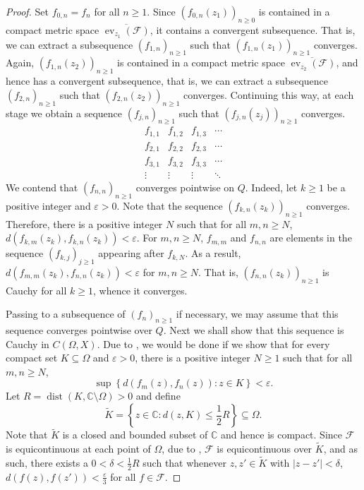 \documentclass[11pt]{article}
\theoremstyle{thmstyle}
\theoremstyle{defstyle}
\newcommand{\bbC}{\mathbb{C}}
\newcommand{\scrF}{\mathscr{F}}
\newcommand{\wt}[1]{\widetilde{#1}}
\newcommand{\ev}{\operatorname{ev}}
\renewcommand{\le}{\leqslant}
\renewcommand{\ge}{\geqslant}
\begin{document}
\begin{proof}
    Set $f_{0, n} = f_n$ for all $n\ge 1$. Since $(f_{0, n}(z_1))_{n\ge 0}$ is contained in a compact metric space $\overline{\ev_{z_1}(\scrF)}$, it contains a convergent subsequence. That is, we can extract a subsequence $(f_{1, n})_{n\ge 1}$ such that $(f_{1, n}(z_1))_{n\ge 1}$ converges. Again, $(f_{1, n}(z_2))_{n\ge 1}$ is contained in a compact metric space $\overline{\ev_{z_2}(\scrF)}$, and hence has a convergent subsequence, that is, we can extract a subsequence $(f_{2, n})_{n\ge 1}$ such that $(f_{2, n}(z_2))_{n\ge 1}$ converges. Continuing this way, at each stage we obtain a sequence $(f_{j, n})_{n\ge 1}$ such that $(f_{j, n}(z_j))_{n\ge 1}$ converges.
    \begin{equation*}
        \begin{array}{cccc}
            f_{1, 1} & f_{1,2} & f_{1,3} & \cdots\\
            f_{2, 1} & f_{2,2} & f_{2,3} & \cdots\\
            f_{3, 1} & f_{3,2} & f_{3,3} & \cdots\\
            \vdots & \vdots & \vdots & \ddots
        \end{array}
    \end{equation*}
    We contend that $(f_{n, n})_{n\ge 1}$ converges pointwise on $Q$. Indeed, let $k\ge 1$ be a positive integer and $\varepsilon > 0$. Note that the sequence $(f_{k, n}(z_k))_{n\ge 1}$ converges. Therefore, there is a positive integer $N$ such that for all $m,n\ge N$, $d(f_{k, m}(z_k), f_{k, n}(z_k)) < \varepsilon$. For $m,n\ge N$, $f_{m,m}$ and $f_{n, n}$ are elements in the sequence $(f_{k, j})_{j\ge 1}$ appearing after $f_{k, N}$. As a result, $d(f_{m, m}(z_k), f_{n, n}(z_k)) < \varepsilon$ for $m,n\ge N$. That is, $(f_{n, n}(z_k))_{n\ge 1}$ is Cauchy for all $k\ge 1$, whence it converges.

    Passing to a subsequence of $(f_n)_{n\ge 1}$ if necessary, we may assume that this sequence converges pointwise over $Q$. Next we shall show that this sequence is Cauchy in $C(\Omega, X)$. Due to , we would be done if we show that for every compact set $K\subseteq\Omega$ and $\varepsilon > 0$, there is a positive integer $N\ge 1$ such that for all $m,n\ge N$, 
    \begin{equation*}
        \sup\left\{d(f_m(z), f_n(z))\colon z\in K\right\} < \varepsilon.
    \end{equation*}
    Let $R = \operatorname{dist}(K, \bbC\setminus\Omega) > 0$ and define 
    \begin{equation*}
        \wt K = \left\{z\in\bbC\colon d(z, K) \le \frac{1}{2}R\right\}\subseteq\Omega.
    \end{equation*}
    Note that $\wt K$ is a closed and bounded subset of $\bbC$ and hence is compact. Since $\scrF$ is equicontinuous at each point of $\Omega$, due to , $\scrF$ is equicontinuous over $\wt K$, and as such, there exists a $0 < \delta < \frac{1}{2}R$ such that whenever $z, z'\in\wt K$ with $|z - z'| < \delta$, $d(f(z), f(z')) < \frac{\varepsilon}{3}$ for all $f\in\scrF$.


\end{proof}
\end{document}
